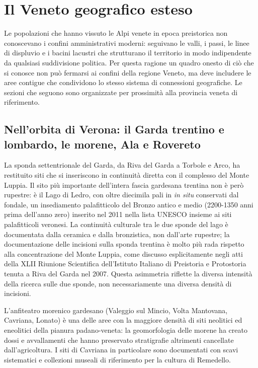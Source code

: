 \section{Il Veneto geografico esteso}

Le popolazioni che hanno vissuto le Alpi venete in epoca preistorica non conoscevano i confini amministrativi moderni: seguivano le valli, i passi, le linee di displuvio e i bacini lacustri che strutturano il territorio in modo indipendente da qualsiasi suddivisione politica. Per questa ragione un quadro onesto di ciò che si conosce non può fermarsi ai confini della regione Veneto, ma deve includere le aree contigue che condividono lo stesso sistema di connessioni geografiche. Le sezioni che seguono sono organizzate per prossimità alla provincia veneta di riferimento.

\subsection{Nell'orbita di Verona: il Garda trentino e lombardo, le morene, Ala e Rovereto}

La sponda settentrionale del Garda, da Riva del Garda a Torbole e Arco, ha restituito siti che si inseriscono in continuità diretta con il complesso del Monte Luppia. Il sito più importante dell'intera fascia gardesana trentina non è però rupestre: è il Lago di Ledro, con oltre diecimila pali in \emph{in situ} conservati dal fondale, un insediamento palafitticolo del Bronzo antico e medio (2200-1350 anni prima dell'anno zero) inserito nel 2011 nella lista UNESCO insieme ai siti palafitticoli veronesi. La continuità culturale tra le due sponde del lago è documentata dalla ceramica e dalla bronzistica, non dall'arte rupestre; la documentazione delle incisioni sulla sponda trentina è molto più rada rispetto alla concentrazione del Monte Luppia, come discusso esplicitamente negli atti della XLII Riunione Scientifica dell'Istituto Italiano di Preistoria e Protostoria tenuta a Riva del Garda nel 2007. Questa asimmetria riflette la diversa intensità della ricerca sulle due sponde, non necessariamente una diversa densità di incisioni.

L'anfiteatro morenico gardesano (Valeggio sul Mincio, Volta Mantovana, Cavriana, Lonato) è una delle aree con la maggiore densità di siti neolitici ed eneolitici della pianura padano-veneta: la geomorfologia delle morene ha creato dossi e avvallamenti che hanno preservato stratigrafie altrimenti cancellate dall'agricoltura. I siti di Cavriana in particolare sono documentati con scavi sistematici e collezioni museali di riferimento per la cultura di Remedello.

